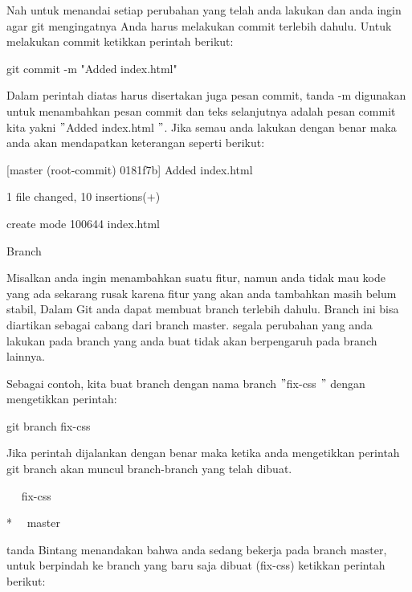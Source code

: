 \vspace{12pt}
\noindent 
Nah untuk menandai setiap perubahan yang telah anda lakukan dan anda ingin agar git mengingatnya Anda harus melakukan commit terlebih dahulu. Untuk melakukan commit ketikkan perintah berikut: \par
\noindent 
 \hspace*{0.5in} git commit -m "Added index.html" \par
\noindent 
Dalam perintah diatas harus disertakan juga pesan commit, tanda -m digunakan untuk menambahkan pesan commit dan teks selanjutnya adalah pesan commit kita yakni  $ " $Added index.html $ " $. Jika semau anda lakukan dengan benar maka anda akan mendapatkan keterangan seperti berikut: \par
\vspace{12pt}
\noindent 
 \hspace*{0.5in} [master (root-commit) 0181f7b] Added index.html \par
\noindent 
 \hspace*{0.5in}  1 file changed, 10 insertions(+) \par
\noindent 
 \hspace*{0.5in}  create mode 100644 index.html \par
\noindent 
 \hspace*{0.5in} Branch \par
\noindent 
Misalkan anda ingin menambahkan suatu fitur, namun anda tidak mau kode yang ada sekarang rusak karena fitur yang akan anda tambahkan masih belum stabil, Dalam Git anda dapat membuat branch terlebih dahulu. Branch ini bisa diartikan sebagai cabang dari branch master. segala perubahan yang anda lakukan pada branch yang anda buat tidak akan berpengaruh pada branch lainnya. \par
\noindent 
Sebagai contoh, kita buat branch dengan nama branch  $ " $fix-css $ " $ dengan mengetikkan perintah: \par
\noindent 
 \hspace*{0.5in} git branch fix-css \par
\noindent 
Jika perintah dijalankan dengan benar maka ketika anda mengetikkan perintah git branch akan muncul branch-branch yang telah dibuat. \par
\noindent 
 \hspace*{0.5in} ~~ fix-css \par
\noindent 
 \hspace*{0.5in} *~~ master \par
\noindent 
tanda Bintang menandakan bahwa anda sedang bekerja pada branch master, untuk berpindah ke branch yang baru saja dibuat (fix-css) ketikkan perintah berikut: \par
